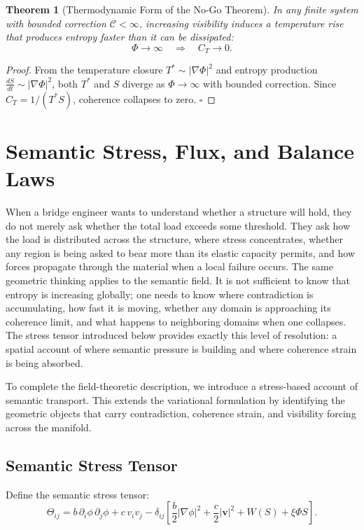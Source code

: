 \documentclass[12pt,a4paper]{article}
\newtheorem{theorem}{Theorem}
\begin{document}
\begin{theorem}[Thermodynamic Form of the No-Go Theorem]
In any finite system with bounded correction $\mathcal{C} < \infty$, increasing visibility induces a temperature rise that produces entropy faster than it can be dissipated:
\[
\Phi \to \infty \quad \Rightarrow \quad C_T \to 0.
\]
\end{theorem}

\begin{proof}
From the temperature closure $T^* \sim |\nabla \Phi|^2$ and entropy production $\frac{dS}{dt} \sim |\nabla \Phi|^2$, both $T^*$ and $S$ diverge as $\Phi \to \infty$ with bounded correction. Since $C_T = 1/(T^* S)$, coherence collapses to zero. \hfill$\square$
\end{proof}

\section{Semantic Stress, Flux, and Balance Laws}

When a bridge engineer wants to understand whether a structure will hold, they do not merely ask whether the total load exceeds some threshold. They ask how the load is distributed across the structure, where stress concentrates, whether any region is being asked to bear more than its elastic capacity permits, and how forces propagate through the material when a local failure occurs. The same geometric thinking applies to the semantic field. It is not sufficient to know that entropy is increasing globally; one needs to know where contradiction is accumulating, how fast it is moving, whether any domain is approaching its coherence limit, and what happens to neighboring domains when one collapses. The stress tensor introduced below provides exactly this level of resolution: a spatial account of where semantic pressure is building and where coherence strain is being absorbed.

To complete the field-theoretic description, we introduce a stress-based account of semantic transport. This extends the variational formulation by identifying the geometric objects that carry contradiction, coherence strain, and visibility forcing across the manifold.

\subsection{Semantic Stress Tensor}

Define the semantic stress tensor:
\[
\Theta_{ij}
=
b\,\partial_i \phi\,\partial_j \phi
+
c\,v_i v_j
-
\delta_{ij}
\left[
\frac{b}{2}|\nabla \phi|^2
+
\frac{c}{2}|\mathbf{v}|^2
+
W(S)
+
\xi \Phi S
\right].
\]
\end{document}
